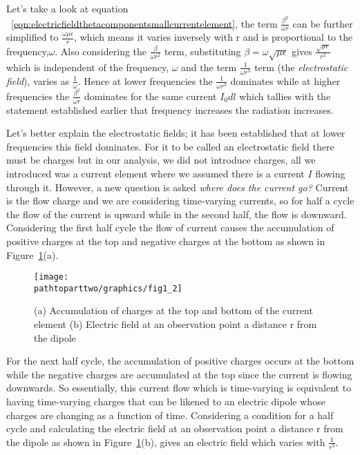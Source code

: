 Let's take a look at equation ~\eqref{eqn:electricfieldthetacomponentsmallcurrentelement}, the term $\frac{\beta^2}{\omega r}$ can be further simplified to $\frac{\omega \mu \epsilon}{r}$, which means it varies inversely with r and is proportional to the frequency,$\omega$. Also considering the $\frac{\beta}{\omega r^2}$ term, substituting $\beta = \omega \sqrt{\mu \epsilon}$ gives $\frac{\sqrt{\mu \epsilon}}{r^2}$ which is independent of the frequency, $\omega$ and the term $\frac{1}{\omega r^3}$ term (the \emph{electrostatic field}), varies as $\frac{1}{\omega }$. Hence at lower frequencies the $\frac{1}{\omega r^3}$ dominates while at higher frequencies the $\frac{\beta^2}{\omega r}$ dominates for the same current $I_0dl$ which tallies with the statement established earlier that frequency increases the radiation increases. 

Let's better explain the electrostatic fields; it has been established that at lower frequencies this field dominates. For it to be called an electrostatic field there must be charges but in our analysis, we did not introduce charges, all we introduced was a current element where we assumed there is a current $I$ flowing through it. However, a new question is asked \emph{where does the current go?} Current is the flow charge and we are considering time-varying currents, so for half a cycle the flow of the current is upward while in the second half, the flow is downward. Considering the first half cycle the flow of current causes the accumulation of positive charges at the top and negative charges at the bottom as shown in Figure~\ref{fig:dipole}(a).
\begin{figure}[h]
\centering
\texttt{[image: \\pathtoparttwo/graphics/fig1\_2]}
\caption{(a) Accumulation of charges at the top and bottom of the current element (b) Electric field at an observation point a distance r from the dipole}
\label{fig:dipole}
\end{figure}

For the next half cycle, the accumulation of positive charges occurs at the bottom while the negative charges are accumulated at the top since the current is flowing downwards. So essentially, this current flow which is time-varying is equivalent to having time-varying charges that can be likened to an electric dipole whose charges are changing as a function of time. Considering a condition for a half cycle and calculating the electric field at an observation point a distance r from the dipole as shown in Figure~\ref{fig:dipole}(b), gives an electric field which varies with $\frac{1}{r^3}$.

